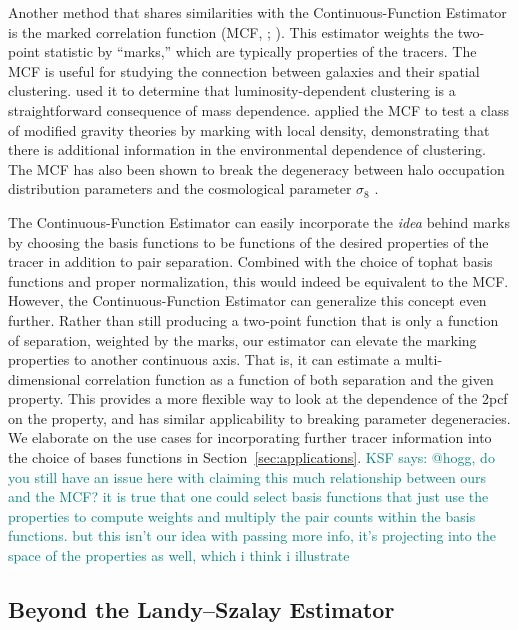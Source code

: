 \documentclass[modern]{aastex62}
\newcommand{\cf}{2pcf\xspace} %
\newcommand{\Est}{The Continuous-Function Estimator\xspace}
\newcommand{\est}{the Continuous-Function Estimator\xspace}
\newcommand{\KSF}[1]{\textcolor{teal}{KSF says: #1}}
\begin{document}
Another method that shares similarities with \est is the marked correlation function (MCF, \citealt{Beisbart2000}; \citealt{Sheth2005}).
This estimator weights the two-point statistic by ``marks,'' which are typically properties of the tracers.
The MCF is useful for studying the connection between galaxies and their spatial clustering.
\cite{Skibba2006} used it to determine that luminosity-dependent clustering is a straightforward consequence of mass dependence.
\cite{Armijo2018} applied the MCF to test a class of modified gravity theories by marking with local density, demonstrating that there is additional information in the environmental dependence of clustering.
The MCF has also been shown to break the degeneracy between halo occupation distribution parameters and the cosmological parameter $\sigma_8$ \citep{WhitePadmanabhan2009}.

\Est can easily incorporate the \textit{idea} behind marks by choosing the basis functions to be functions of the desired properties of the tracer in addition to pair separation.
Combined with the choice of tophat basis functions and proper normalization, this would indeed be equivalent to the MCF.
However, \est can generalize this concept even further. 
Rather than still producing a two-point function that is only a function of separation, weighted by the marks, our estimator can elevate the marking properties to another continuous axis.
That is, it can estimate a multi-dimensional correlation function as a function of both separation and the given property.
This provides a more flexible way to look at the dependence of the \cf on the property, and has similar applicability to breaking parameter degeneracies.
We elaborate on the use cases for incorporating further tracer information into the choice of bases functions in Section~\ref{sec:applications}. \KSF{@hogg, do you still have an issue here with claiming this much relationship between ours and the MCF? it is true that one could select basis functions that just use the properties to compute weights and multiply the pair counts within the basis functions. but this isn't our idea with passing more info, it's projecting into the space of the properties as well, which i think i illustrate}


\subsection{Beyond the Landy--Szalay Estimator}
\label{sec:beyondls}
\end{document}
